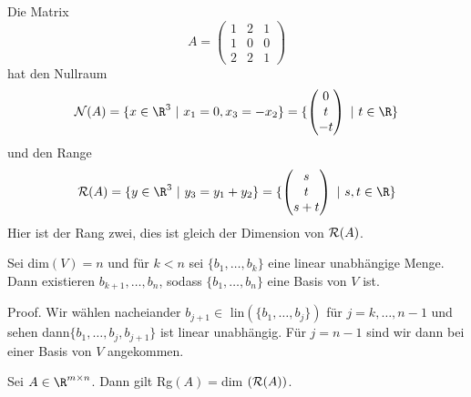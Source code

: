 \documentclass[letterpaper,10pt,english]{jupyterBook}
\begin{document}
\begin{example}{}{}



Die Matrix
\begin{equation*}
 A = \left(\begin{matrix} 1 & 2 & 1 \\ 1 & 0 & 0  \\ 2 & 2 & 1  \end{matrix} \right)
\end{equation*}
hat den Nullraum
\begin{equation*}
 {\cal N}(A) = \{ x \in \R^3 ~|~x_1=0, x_3= -x_2\} =\{ \left(\begin{matrix} 0 \\ t  \\ -t  \end{matrix} \right) ~|~ t \in \R\}
\end{equation*}
und den Range
\begin{equation*}
 {\cal R}(A) = \{ y \in \R^3~|~y_3 = y_1 + y_2\}=\{ \left(\begin{matrix} s \\ t  \\ s+t  \end{matrix} \right) ~|~ s,t \in \R\}
\end{equation*}
Hier ist der Rang zwei, dies ist gleich der Dimension von \({\cal R}(A)\).
\end{example}
\label{vektorraeume/LGS:lemma-1}
\begin{lemma}{}{}



Sei dim\((V)=n\) und für \(k < n\) sei \(\{b_1,\ldots,b_k\}\) eine linear unabhängige Menge. Dann existieren \(b_{k+1}, \ldots, b_n\), sodass \(\{b_1,\ldots,b_n\}\) eine Basis von \(V\) ist.
\end{lemma}

\begin{emphBox}{}{}
Proof.  Wir wählen nacheiander \(b_{j+1} \in \) lin\((\{b_1,\ldots,b_j\})\) für \(j=k,\ldots,n-1\) und sehen dann\( \{b_1,\ldots,b_j,b_{j+1} \}\) ist linear unabhängig. Für \(j=n-1\) sind wir dann bei einer Basis von \(V\) angekommen.
\end{emphBox}
\label{vektorraeume/LGS:lemma-2}
\begin{lemma}{}{}



Sei \(A \in \R^{m \times n}\). Dann gilt Rg\((A)=\)dim \(({\cal R}(A))\).
\end{lemma}
\end{document}

